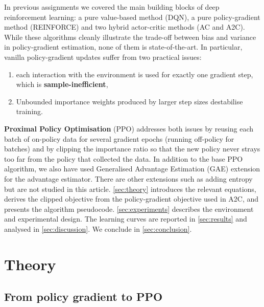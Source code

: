 \documentclass{article}
\theoremstyle{plain}
\theoremstyle{definition}
\theoremstyle{remark}
\begin{document}
In previous assignments we covered the main building blocks of deep reinforcement learning: a pure value-based method (DQN), a pure policy-gradient method (REINFORCE) and two hybrid actor-critic methods (AC and A2C). While these algorithms cleanly illustrate the trade-off between bias and variance in policy-gradient estimation, none of them is state-of-the-art. In particular, vanilla policy-gradient updates suffer from two practical issues: 
\begin{enumerate}
    \item each interaction with the environment is used for exactly one gradient step, which is \textbf{sample-inefficient}, 
    \item Unbounded importance weights produced by larger step sizes destabilise training. 
\end{enumerate}
\textbf{Proximal Policy Optimisation} (PPO) addresses both issues by reusing each batch of on-policy data for several gradient epochs (running off-policy for batches) and by clipping the importance ratio so that the new policy never strays too far from the policy that collected the data.
In addition to the base PPO algorithm, we also have used Generalised Advantage Estimation (GAE) \cite{schulman2016gae} extension for the advantage estimator. There are other extensions such as adding entropy but are not studied in this article. \autoref{sec:theory} introduces the relevant equations, derives the clipped objective from the policy-gradient objective used in A2C, and presents the algorithm pseudocode. \autoref{sec:experiments} describes the environment and experimental design. The learning curves are reported in \autoref{sec:results} and analysed in \autoref{sec:discussion}. We conclude in \autoref{sec:conclusion}.

\section{Theory}\label{sec:theory}

\subsection{From policy gradient to PPO}\label{sec:theory:pg}
\end{document}
